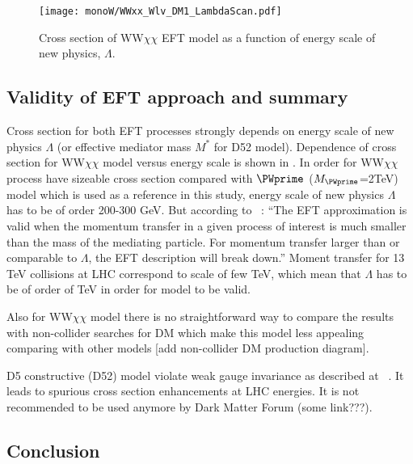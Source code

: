 \begin{figure}[]
 \texttt{[image: monoW/WWxx\_Wlv\_DM1\_LambdaScan.pdf]}
  \caption{Cross section of WW$\chi\chi$ EFT model as a function of energy scale of new physics, $\Lambda$.}
  \label{fig:lambdaScan}
\end{figure}

\subsection{Validity of EFT approach and summary}

Cross section for both EFT processes strongly depends on energy scale of new physics $\Lambda$ (or effective mediator mass $M^{*}$ for D52 model).
Dependence of cross section for WW$\chi\chi$ model versus energy scale is shown in .
In order for WW$\chi\chi$ process have sizeable cross section compared with $\PWprime$ ($M_{\PWprime}$=2TeV) model which is used as a reference in this study, 
energy scale of new physics $\Lambda$ has to be of order 200-300 GeV. But according to ~\cite{arXiv:1512.00476}: 
``The EFT approximation is valid when the momentum transfer in a given
process of interest is much smaller than the mass of the mediating
particle. For momentum transfer larger than or comparable to
$\Lambda$, the EFT description will break down.''
Moment transfer for 13 TeV collisions at LHC correspond to scale of few TeV, 
which mean that $\Lambda$ has to be of order of TeV in order for model to be valid.

Also for WW$\chi\chi$ model there is no straightforward way to compare the
results with non-collider searches for DM
which make this model less appealing comparing with other models [add non-collider DM production diagram].

D5 constructive (D52) model violate weak gauge invariance as described at ~\cite{arXiv:1503.07874}.
It leads to spurious cross section enhancements at LHC energies. It is not recommended to be used anymore by Dark Matter Forum (some link???).

\subsection{Conclusion}

